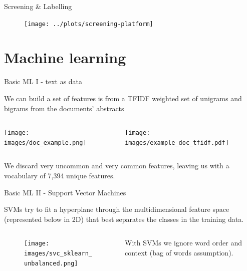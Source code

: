 \documentclass[9pt]{beamer}
\begin{document}
\begin{frame}{Screening \& Labelling}

\begin{figure}
	\texttt{[image: ../plots/screening-platform]}
\end{figure}

\end{frame}



\section{Machine learning}

\begin{frame}{Basic ML I - text as data}

We can build a set of features is from a TFIDF weighted set of unigrams and bigrams from the documents' abstracts

\medskip

\begin{columns}
	\begin{column}{0.5\linewidth}
		\texttt{[image: images/doc\_example.png]}
	\end{column}
	\begin{column}{0.5\linewidth}
		\texttt{[image: images/example\_doc\_tfidf.pdf]}
	\end{column}
\end{columns}

\medskip

We discard very uncommon and very common features, leaving us with a vocabulary of 7,394 unique features.

\end{frame}

\begin{frame}{Basic ML II - Support Vector Machines}

SVMs try to fit a hyperplane through the multidimensional feature space (represented below in 2D) that best separates the classes in the training data.

\begin{columns}
\begin{column}{0.618\linewidth}
	\begin{figure}
		\texttt{[image: images/svc\_sklearn\_unbalanced.png]}
	\end{figure}
\end{column}
\begin{column}{0.382\linewidth}
	With SVMs we ignore word order and context (bag of words assumption).
\end{column}
\end{columns}

\end{frame}
\end{document}

